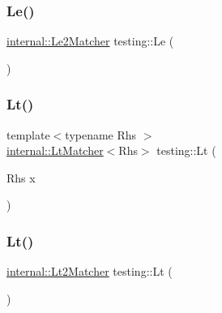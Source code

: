 \mbox{\label{namespacetesting_a04def1c627ea7e3fce2f08cb06e83ebc}} 
\subsubsection{\texorpdfstring{Le()}{Le()}\hspace{0.1cm}{\footnotesize\ttfamily [2/2]}}
{\footnotesize\ttfamily \hyperlink{classtesting_1_1internal_1_1_le2_matcher}{internal\+::\+Le2\+Matcher} testing\+::\+Le (\begin{DoxyParamCaption}{ }\end{DoxyParamCaption})\hspace{0.3cm}{\ttfamily [inline]}}

\mbox{\label{namespacetesting_ad621459957a8bcdd3c256b7940ecbf99}} 
\subsubsection{\texorpdfstring{Lt()}{Lt()}\hspace{0.1cm}{\footnotesize\ttfamily [1/2]}}
{\footnotesize\ttfamily template$<$typename Rhs $>$ \\
\hyperlink{classtesting_1_1internal_1_1_lt_matcher}{internal\+::\+Lt\+Matcher}$<$Rhs$>$ testing\+::\+Lt (\begin{DoxyParamCaption}\item[{Rhs}]{x }\end{DoxyParamCaption})\hspace{0.3cm}{\ttfamily [inline]}}

\mbox{\label{namespacetesting_a3b4d6d29d715c1bf219163f5206b53d4}} 
\subsubsection{\texorpdfstring{Lt()}{Lt()}\hspace{0.1cm}{\footnotesize\ttfamily [2/2]}}
{\footnotesize\ttfamily \hyperlink{classtesting_1_1internal_1_1_lt2_matcher}{internal\+::\+Lt2\+Matcher} testing\+::\+Lt (\begin{DoxyParamCaption}{ }\end{DoxyParamCaption})\hspace{0.3cm}{\ttfamily [inline]}}

